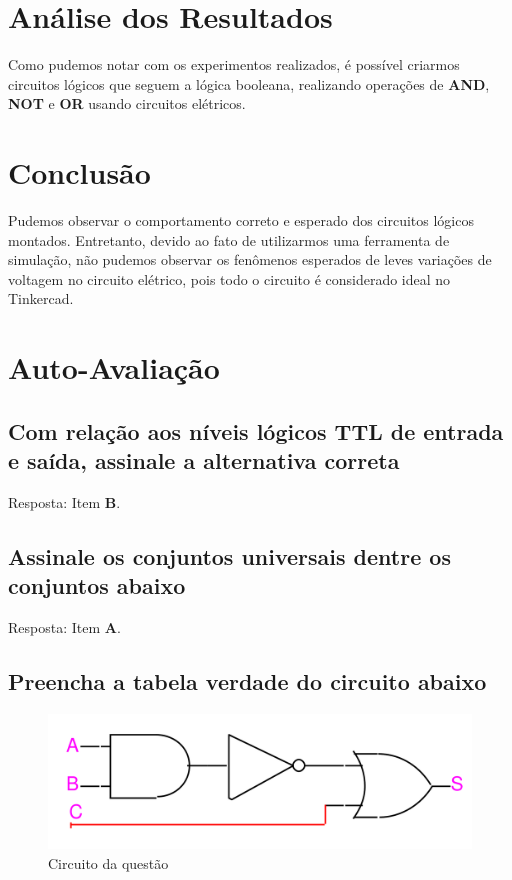 \documentclass[12pt]{article}
\begin{document}
\section{Análise dos Resultados}
\label{sec:Resultados}

Como pudemos notar com os experimentos realizados, é possível criarmos circuitos
lógicos que seguem a lógica booleana, realizando operações de \textbf{AND},
\textbf{NOT} e \textbf{OR} usando circuitos elétricos.

\section{Conclusão}
\label{sec:Conclusao}

Pudemos observar o comportamento correto e esperado dos circuitos lógicos
montados. Entretanto, devido ao fato de utilizarmos uma ferramenta de simulação,
não pudemos observar os fenômenos esperados de leves variações de voltagem no
circuito elétrico, pois todo o circuito é considerado ideal no Tinkercad.

\nocite{*}



\newpage
\section*{Auto-Avaliação}

\subsection{Com relação aos níveis lógicos TTL de entrada e saída, assinale a
  alternativa correta}
Resposta: Item \textbf{B}.

\subsection{Assinale os conjuntos universais dentre os conjuntos abaixo}
Resposta: Item \textbf{A}.

\subsection{Preencha a tabela verdade do circuito abaixo}
\begin{figure}[H]
    \centering
    \includegraphics[width=.9\textwidth]{exp1_4.3_f1.png}
    \caption{Circuito da questão}
    \label{fig:exp1_4.3_f1}
\end{figure}
\end{document}
